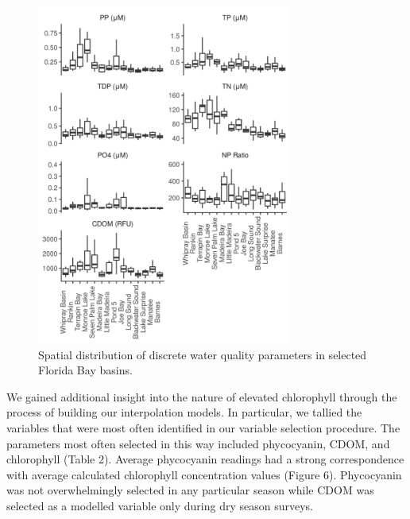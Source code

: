 \vspace{2em}

\begin{figure}
  \centering
  \includegraphics[width=0.75\textwidth]{../../figures/nonchlboxplot.png}
  \caption{Spatial distribution of discrete water quality parameters in selected Florida Bay basins.}
  \label{fig:5}
\end{figure}

We gained additional insight into the nature of elevated chlorophyll through the process of building our interpolation models. In particular, we tallied the variables that were most often identified in our variable selection procedure. The parameters most often selected in this way included phycocyanin, CDOM, and chlorophyll (Table 2). Average phycocyanin readings had a strong correspondence with average calculated chlorophyll concentration values (Figure 6). Phycocyanin was not overwhelmingly selected in any particular season while CDOM was selected as a modelled variable only during dry season surveys.

